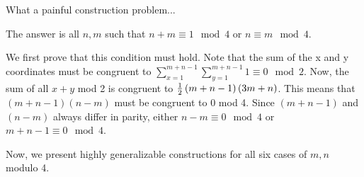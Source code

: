 \documentclass[10pt]{../usamts}
\begin{document}
\begin{solution}
What a painful construction problem...

The answer is all $n,m$ such that $n+m \equiv 1 \mod 4$ or $n \equiv m \mod 4$.

We first prove that this condition must hold. Note that the sum of the x and y coordinates must be congruent to $\sum_{x=1}^{m+n-1} \sum_{y=1}^{m+n-1} 1 \equiv 0 \mod 2$. Now, the sum of all $x+y$ mod 2 is congruent to $\frac{1}{2}\left( m+n-1 \right)\left( 3m+n \right)$. This means that $(m+n-1)(n-m)$ must be congruent to 0 mod 4. Since $(m+n-1)$ and $(n-m)$ always differ in parity, either $n-m \equiv 0 \mod 4$ or $m + n - 1 \equiv 0 \mod 4$.

Now, we present highly generalizable constructions for all six cases of $m,n$ modulo 4.


\end{solution}
\end{document}

